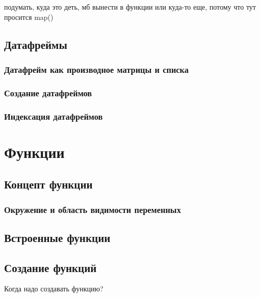 \documentclass[
  letterpaper,
]{scrbook}
\theoremstyle{definition}
\theoremstyle{remark}
\begin{document}
подумать, куда это деть, мб вынести в функции или куда-то еще, потому
что тут просится map()

\section{Датафреймы}\label{rdstructs-dataframes}

\subsection{Датафрейм как производное матрицы и
списка}\label{rdstructs-dataframes-list-matris-child}

\subsection{Создание датафреймов}\label{rdstructs-dataframes-creation}

\subsection{Индексация датафреймов}\label{rdstructs-dataframes-indexing}


\chapter{Функции}\label{rfuncs}

\section{Концепт функции}\label{rfuncs-concept}

\subsection{Окружение и область видимости
переменных}\label{rfuncs-environment}

\section{Встроенные функции}\label{rfuncs-built}

\section{Создание функций}\label{rfuncs-custom}

Когда надо создавать функцию?
\end{document}

